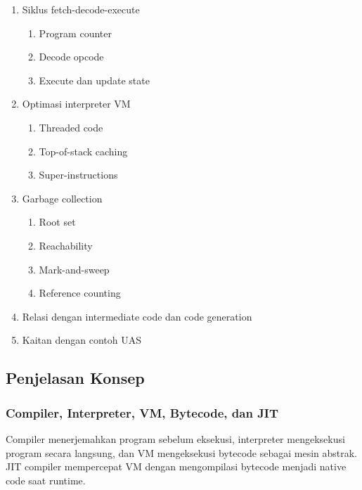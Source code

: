 \begin{enumerate}
\begin{enumerate}
        \item \pwajib Operand stack
        \item \pwajib Local variables
        \item \pwajib Heap
    \end{enumerate}
    \item \pwajib Siklus fetch-decode-execute
    \begin{enumerate}
        \item \pwajib Program counter
        \item \pwajib Decode opcode
        \item \pwajib Execute dan update state
    \end{enumerate}
    \item \ppaham Optimasi interpreter VM
    \begin{enumerate}
        \item \ppaham Threaded code
        \item \ppaham Top-of-stack caching
        \item \ppaham Super-instructions
    \end{enumerate}
    \item \pwajib Garbage collection
    \begin{enumerate}
        \item \pwajib Root set
        \item \pwajib Reachability
        \item \ppaham Mark-and-sweep
        \item \ppaham Reference counting
    \end{enumerate}
    \item \pwajib Relasi dengan intermediate code dan code generation
    \item \ppaham Kaitan dengan contoh UAS
\end{enumerate}

\subsection{Penjelasan Konsep}

\subsubsection{Compiler, Interpreter, VM, Bytecode, dan JIT}

\begin{jawab}
Compiler menerjemahkan program sebelum eksekusi, interpreter mengeksekusi program secara langsung, dan VM mengeksekusi bytecode sebagai mesin abstrak. JIT compiler mempercepat VM dengan mengompilasi bytecode menjadi native code saat runtime.
\end{jawab}

